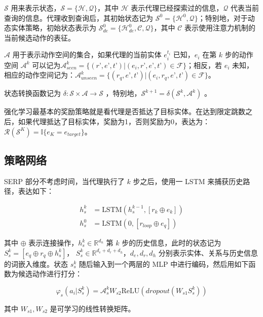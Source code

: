\documentclass[a4paper, AutoFakeBold]{article}
\begin{document}
${\mathcal S}$ 用来表示状态，${\mathcal S}=\{{\mathcal H},{\mathcal Q}\}$，其中 ${\mathcal H}$ 表示代理已经探索过的信息，${\mathcal Q}$ 代表当前查询的信息。代理收到查询后，其初始状态记为 ${\mathcal S}^0=\{{\mathcal H}^0,{\mathcal Q}\}$；特别地，对于动态实体策略，初始状态表示为 ${\mathcal S}^0_{de}=\{{\mathcal H}^0_{de},{\mathcal C},{\mathcal Q}\}$，其中 ${\mathcal C}$ 表示使用注意力机制的当前候选动作的表征。

${\mathcal A}$ 用于表示动作空间的集合，如果代理的当前实体 $e_i^{t_i}$ 已知，$e_i$ 在第 $k$ 步的动作空间 ${\mathcal A}^k$ 可以记为${\mathcal A}^k_{seen}=\{(r’,e’,t’)|(e_i,r’,e’,t’)\in{\mathcal F}\}$；相反，若 $e_i$ 未知，相应的动作空间记为：${\mathcal A}^k_{unseen}=\{(r_q,e’,t’)|(e_i,r_q,e’,t’)\in{\mathcal F}\}$。

状态转换函数记为 $\delta:{\mathcal S}\times{\mathcal A}\rightarrow{\mathcal S}$ ，特别地，${\mathcal S}^{k+1}=\delta({\mathcal S}^k,{\mathcal A}^k)$ 。

强化学习最基本的奖励策略就是看代理是否抵达了目标实体。在达到限定跳数之后，如果代理抵达了目标实体，奖励为1，否则奖励为0，表达为：${\mathcal R}({\mathcal S}^K)={{\mathbb I}\{e_K=e_{target}\}}$。


\subsection{策略网络}

SERP 部分不考虑时间，当代理执行了 $k$ 步之后，使用一 LSTM 来捕获历史路径，表达如下：

\begin{equation}
	\begin{aligned}
h^k_s & =\text{LSTM}(h_s^{k-1},[r_k\oplus e_k]) \\ 
h^0_s & =\text{LSTM}(0,[r_{loop}\oplus e_q])
	\end{aligned}
\end{equation}

其中 $\oplus$ 表示连接操作，$h_s^k\in{\mathbb R}^{d_n}$ 第 $k$ 步的历史信息，此时的状态记为$S_s^k=[e_q\oplus r_q \oplus h^k_s]$， $S_s^k\in{\mathbb R}^{d_e+d_r+d_h}$，$d_e,d_r,d_h$ 分别表示实体、关系与历史信息的词嵌入维度。状态 $s_s^k$ 随后输入到一个两层的 MLP 中进行编码，然后用如下函数为候选动作进行打分：

\begin{equation}
\varphi_s(a_i|S^k_s)={\mathcal A}_s^k W_{s2}\text{ReLU}(dropout(W_{s1}S^k_s))
\end{equation}

其中 $W_{s1},W_{s2}$ 是可学习的线性转换矩阵。
\end{document}
